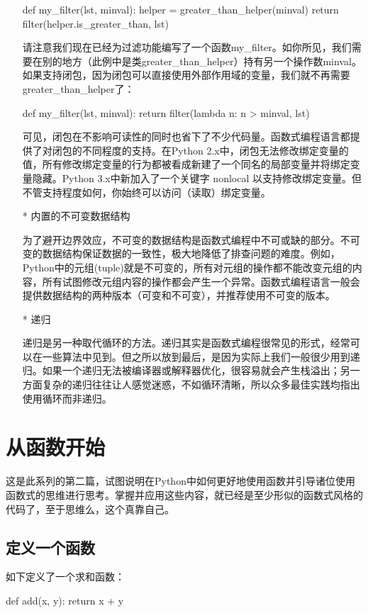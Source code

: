 \documentclass[12pt,a4paper]{report}
\begin{document}
\begin{enumerate}
\begin{python}[moreemph={[4]42},caption={},label=ex1]
def my_filter(lst, minval):
    helper = greater_than_helper(minval)
    return filter(helper.is_greater_than, lst)
    \end{python}
    请注意我们现在已经为过滤功能编写了一个函数my\_filter。如你所见，我们需要在别的地方（此例中是类greater\_than\_helper）持有另一个操作数minval。如果支持闭包，因为闭包可以直接使用外部作用域的变量，我们就不再需要greater\_than\_helper了： 
    \begin{python}[moreemph={[4]42},caption={},label=ex1]
def my_filter(lst, minval):
    return filter(lambda n: n > minval, lst)
    \end{python}
    可见，闭包在不影响可读性的同时也省下了不少代码量。函数式编程语言都提供了对闭包的不同程度的支持。在Python 2.x中，闭包无法修改绑定变量的值，所有修改绑定变量的行为都被看成新建了一个同名的局部变量并将绑定变量隐藏。Python 3.x中新加入了一个关键字 nonlocal 以支持修改绑定变量。但不管支持程度如何，你始终可以访问（读取）绑定变量。 

\item[*]内置的不可变数据结构
    
    为了避开边界效应，不可变的数据结构是函数式编程中不可或缺的部分。不可变的数据结构保证数据的一致性，极大地降低了排查问题的难度。例如，Python中的元组(tuple)就是不可变的，所有对元组的操作都不能改变元组的内容，所有试图修改元组内容的操作都会产生一个异常。函数式编程语言一般会提供数据结构的两种版本（可变和不可变），并推荐使用不可变的版本。

\item[*]递归

    递归是另一种取代循环的方法。递归其实是函数式编程很常见的形式，经常可以在一些算法中见到。但之所以放到最后，是因为实际上我们一般很少用到递归。如果一个递归无法被编译器或解释器优化，很容易就会产生栈溢出；另一方面复杂的递归往往让人感觉迷惑，不如循环清晰，所以众多最佳实践均指出使用循环而非递归。 
\end{enumerate} 

\chapter{从函数开始} 
这是此系列的第二篇，试图说明在Python中如何更好地使用函数并引导诸位使用函数式的思维进行思考。掌握并应用这些内容，就已经是至少形似的函数式风格的代码了，至于思维么，这个真靠自己。 
\section{定义一个函数} 
如下定义了一个求和函数：
\begin{python}[moreemph={[4]42},caption={},label=ex1]
def add(x, y):
    return x + y
\end{python}
\end{document}
